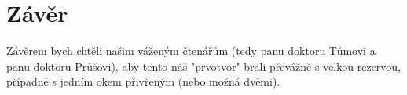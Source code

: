 \documentclass[reqno, a4paper]{amsart}
\begin{document}
				\section{Závěr}
				\label{sec:Závěr}
				Závěrem bych chtěli našim váženým čtenářům (tedy panu doktoru Tůmovi a panu doktoru Průšovi), aby tento náš "prvotvor" brali převážně s velkou rezervou, případně s jedním okem přivřeným (nebo možná dvěmi). 
				
		
\end{document}
